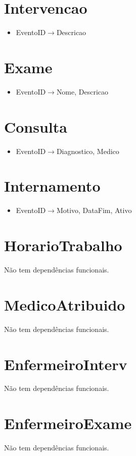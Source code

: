 \documentclass[article, a4paper, 12pt, oneside]{memoir}
\begin{document}
\section*{Intervencao}
\begin{itemize}
	\item EventoID$\rightarrow$Descricao
\end{itemize}

\section*{Exame}
\begin{itemize}
	\item EventoID$\rightarrow$Nome, Descricao
\end{itemize}

\section*{Consulta}
\begin{itemize}
	\item EventoID$\rightarrow$Diagnostico, Medico
\end{itemize}

\section*{Internamento}
\begin{itemize}
	\item EventoID$\rightarrow$Motivo, DataFim, Ativo
\end{itemize}

\section*{HorarioTrabalho}
Não tem dependências funcionais.

\section*{MedicoAtribuido}
Não tem dependências funcionais.

\section*{EnfermeiroInterv}
Não tem dependências funcionais.

\section*{EnfermeiroExame}
Não tem dependências funcionais.
\end{document}
